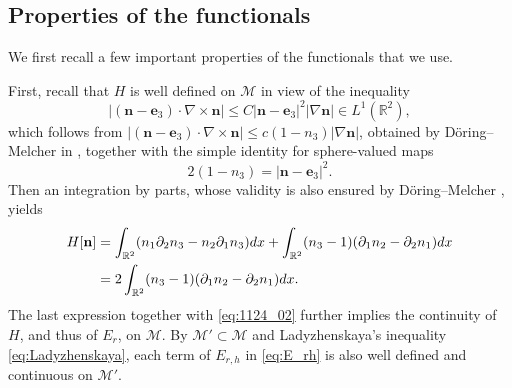\documentclass{amsart}
\numberwithin{equation}{section}
\theoremstyle{definition}
\theoremstyle{remark}
\newcommand{\R}{\mathbb{R}}
\newcommand{\boM}{\mathcal{M}}
\newcommand{\rd}{{\partial}}								%
\newcommand{\nab}{{\nabla}}							%
\newcommand{\bn}{{\mathbf{n}}}
\newcommand{\boe}{{\mathbf{e}}}
\begin{document}
\subsection{Properties of the functionals}\label{subsec:functional}
We first recall a few important properties of the 
functionals that we use.

First, recall that $H$ is well defined on $\boM$ in view of the inequality
\begin{equation}\label{eq:1124_01}
|(\bn-\boe_3)\cdot\nabla\times\bn| \leq C |\bn-\boe_3|^2|\nabla\bn| \in L^1(\R^2),
\end{equation}
which follows from $|(\bn-\boe_3)\cdot\nabla\times\bn|\leq c (1-n_3)|\nabla\bn|$, obtained by D\"oring--Melcher in \cite[Equation (8)]{MR3639614}, together with the simple identity for sphere-valued maps
\begin{equation}\label{eq:1124_02}
    2(1-n_3)=|\bn-\boe_3|^2.
\end{equation}
Then an integration by parts, whose validity is also ensured by D\"oring--Melcher \cite[Section 1.2]{MR3639614}, yields
\begin{align}
H[\bn]
&= 
\int_{\R^2} (n_1 \rd_2 n_3 - n_2\rd_1n_3) dx + \int_{\R^2} (n_3-1) (\rd_1n_2 -\rd_2n_1)dx \notag\\
&= 2 \int_{\R^2} (n_3-1) (\rd_1n_2-\rd_2n_1) dx. \label{eq:H_int_by_parts}
\end{align}
The last expression together with \eqref{eq:1124_02} further implies the continuity of $H$, and thus of $E_r$, on $\boM$.
By $\boM'\subset\boM$ and Ladyzhenskaya's inequality  \eqref{eq:Ladyzhenskaya}, each term of $E_{r,h}$ in \eqref{eq:E_rh} is also well defined and continuous on $\boM'$.
\end{document}
